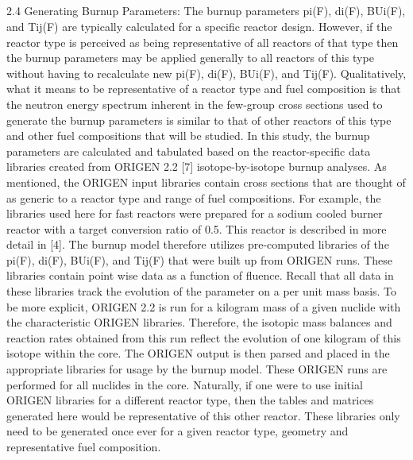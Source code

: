 \subsection{}
\label{1g_sec:}
2.4 Generating Burnup Parameters:
The burnup parameters pi(F), di(F), BUi(F), and Tij(F) are typically calculated for a specific reactor design.  However, if the reactor type is perceived as being representative of all reactors of that type then the burnup parameters may be applied generally to all reactors of this type without having to recalculate new pi(F), di(F), BUi(F), and Tij(F).  Qualitatively, what it means to be representative of a reactor type and fuel composition is that the neutron energy spectrum inherent in the few-group cross sections used to generate the burnup parameters is similar to that of other reactors of this type and other fuel compositions that will be studied.   
In this study, the burnup parameters are calculated and tabulated based on the reactor-specific data libraries created from ORIGEN 2.2 [7] isotope-by-isotope burnup analyses.  As mentioned, the ORIGEN input libraries contain cross sections that are thought of as generic to a reactor type and range of fuel compositions.  For example, the libraries used here for fast reactors were prepared for a sodium cooled burner reactor with a target conversion ratio of 0.5.  This reactor is described in more detail in [4].  The burnup model therefore utilizes pre-computed libraries of the pi(F), di(F), BUi(F), and Tij(F) that were built up from ORIGEN runs.  These libraries contain point wise data as a function of fluence.  Recall that all data in these libraries track the evolution of the parameter on a per unit mass basis.
To be more explicit, ORIGEN 2.2 is run for a kilogram mass of a given nuclide with the characteristic ORIGEN libraries.  Therefore, the isotopic mass balances and reaction rates obtained from this run reflect the evolution of one kilogram of this isotope within the core.  The ORIGEN output is then parsed and placed in the appropriate libraries for usage by the burnup model.  These ORIGEN runs are performed for all nuclides in the core.  Naturally, if one were to use initial ORIGEN libraries for a different reactor type, then the tables and matrices generated here would be representative of this other reactor.  These libraries only need to be generated once ever for a given reactor type, geometry and representative fuel composition.
